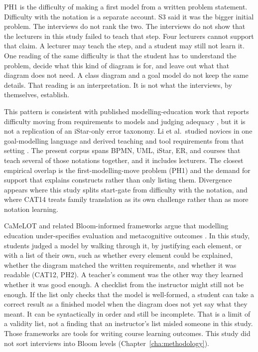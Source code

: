 PH1 is the difficulty of making a first model from a written problem statement. Difficulty with the notation is a separate account. S3 said it was the bigger initial problem. The interviews do not rank the two. The interviews do not show that the lecturers in this study failed to teach that step. Four lecturers cannot support that claim. A lecturer may teach the step, and a student may still not learn it. One reading of the same difficulty is that the student has to understand the problem, decide what this kind of diagram is for, and leave out what that diagram does not need. A class diagram and a goal model do not keep the same details. That reading is an interpretation. It is not what the interviews, by themselves, establish.

This pattern is consistent with published modelling-education work that reports difficulty moving from requirements to models and judging adequacy \cite{istar-learning,maslov2025conceptual,chakraborty2022perceptions}, but it is not a replication of an iStar-only error taxonomy. Li et al.\ studied novices in one goal-modelling language and derived teaching and tool requirements from that setting \cite{istar-learning}. The present corpus spans BPMN, UML, iStar, ER, and courses that teach several of those notations together, and it includes lecturers. The closest empirical overlap is the first-modelling-move problem (PH1) and the demand for support that explains constructs rather than only listing them. Divergence appears where this study splits start-gate from difficulty with the notation, and where CAT14 treats family translation as its own challenge rather than as more notation learning.

CaMeLOT and related Bloom-informed frameworks argue that modelling education under-specifies evaluation and metacognitive outcomes \cite{bogdanova2019camelot,bogdanova2017domain,bork2019framework}. In this study, students judged a model by walking through it, by justifying each element, or with a list of their own, such as whether every element could be explained, whether the diagram matched the written requirements, and whether it was readable (CAT12, PH2). A teacher's comment was the other way they learned whether it was good enough. A checklist from the instructor might still not be enough. If the list only checks that the model is well-formed, a student can take a correct result as a finished model when the diagram does not yet say what they meant. It can be syntactically in order and still be incomplete. That is a limit of a validity list, not a finding that an instructor's list misled someone in this study. Those frameworks are tools for writing course learning outcomes. This study did not sort interviews into Bloom levels (Chapter~\ref{cha:methodology}).

